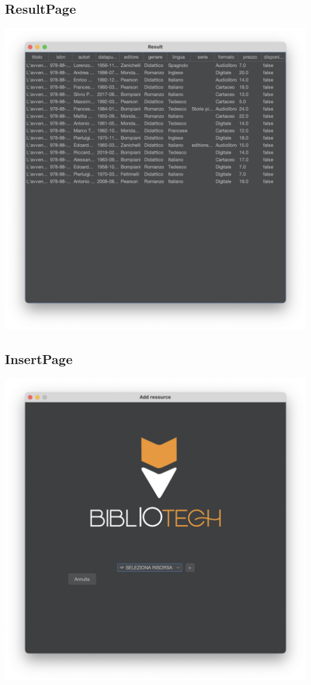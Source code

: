 \subsection{ResultPage}
\includegraphics[scale=0.25]{Immagini/Schermate/Search/ResultPage.png}

\subsection{InsertPage}
\includegraphics[scale=0.25]{Immagini/Schermate/Insert/InserisciRisorsaPage.png}

